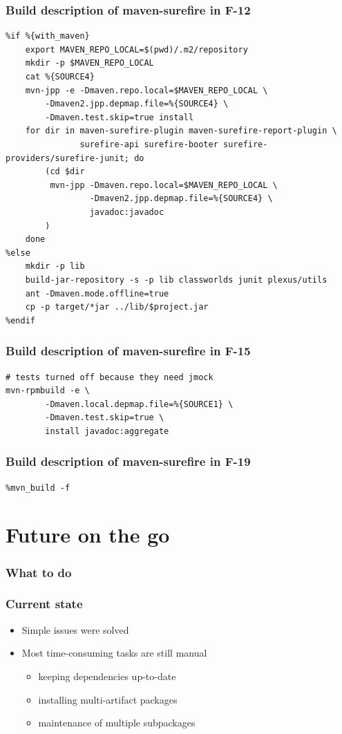 \documentclass[pdftex,unicode,xcolor=table]{beamer}
\begin{document}
\begin{frame}[fragile]
  \frametitle{Build description of maven-surefire in F-12}
  \scriptsize
  \begin{verbatim}
%if %{with_maven}
    export MAVEN_REPO_LOCAL=$(pwd)/.m2/repository
    mkdir -p $MAVEN_REPO_LOCAL
    cat %{SOURCE4}
    mvn-jpp -e -Dmaven.repo.local=$MAVEN_REPO_LOCAL \
        -Dmaven2.jpp.depmap.file=%{SOURCE4} \
        -Dmaven.test.skip=true install
    for dir in maven-surefire-plugin maven-surefire-report-plugin \
               surefire-api surefire-booter surefire-providers/surefire-junit; do
        (cd $dir
         mvn-jpp -Dmaven.repo.local=$MAVEN_REPO_LOCAL \
                 -Dmaven2.jpp.depmap.file=%{SOURCE4} \
                 javadoc:javadoc
        )
    done
%else
    mkdir -p lib
    build-jar-repository -s -p lib classworlds junit plexus/utils
    ant -Dmaven.mode.offline=true
    cp -p target/*jar ../lib/$project.jar
%endif
  \end{verbatim}
  \note{Note!}
\end{frame}

\begin{frame}[fragile]
  \frametitle{Build description of maven-surefire in F-15}
  \scriptsize
  \begin{verbatim}
# tests turned off because they need jmock
mvn-rpmbuild -e \
        -Dmaven.local.depmap.file=%{SOURCE1} \
        -Dmaven.test.skip=true \
        install javadoc:aggregate
  \end{verbatim}
\end{frame}

\begin{frame}[fragile]
  \frametitle{Build description of maven-surefire in F-19}
  \scriptsize
  \begin{verbatim}
%mvn_build -f
  \end{verbatim}
  \note{Note!}
\end{frame}

\section{Future on the go}
\begin{frame}
  \frametitle{What to do}
\end{frame}


\begin{frame}
  \frametitle{Current state}
  \begin{itemize}
    \item Simple issues were solved
    \item Most time-consuming tasks are still manual
    \begin{itemize}
      \item keeping dependencies up-to-date
      \item installing multi-artifact packages
      \item maintenance of multiple subpackages
    \end{itemize}
  \end{itemize}
\end{frame}
\end{document}
